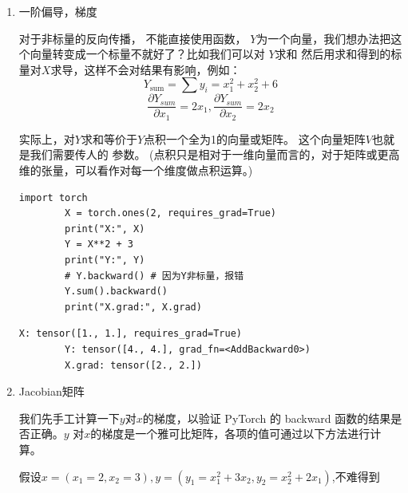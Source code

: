 \label{subsubsec:Pytorch的非标量反向传播}
\begin{enumerate}[label=\arabic*)]
        \item 一阶偏导，梯度

        对于非标量的反向传播，
        不能直接使用函数，
        $Y$为一个向量，我们想办法把这个向量转变成一个标量不就好了？比如我们可以对 $Y$求和
        然后用求和得到的标量对$X$求导，这样不会对结果有影响，例如：
        $$Y_{\mathrm{sum}}=\sum y_{i}=x_{1}^{2}+x_{2}^{2}+6$$
        $$\frac{\partial Y_{sum}}{\partial x_{1}}=2x_{1},\frac{\partial Y_{sum}}{\partial x_{2}}=2x_{2}$$

        实际上，对$Y$求和等价于$Y$点积一个全为1的向量或矩阵。
        这个向量矩阵$V$也就是我们需要传人的  参数。
        (点积只是相对于一维向量而言的，对于矩阵或更高维的张量，可以看作对每一个维度做点积运算。)

        \begin{lstlisting}[style=pythonstyle]
        import torch
        X = torch.ones(2, requires_grad=True)
        print("X:", X)
        Y = X**2 + 3 
        print("Y:", Y)
        # Y.backward() # 因为Y非标量，报错
        Y.sum().backward()
        print("X.grad:", X.grad)
        \end{lstlisting}
        \begin{lstlisting}[style=demostyle,numbers=none]
        X: tensor([1., 1.], requires_grad=True)
        Y: tensor([4., 4.], grad_fn=<AddBackward0>)
        X.grad: tensor([2., 2.])
        \end{lstlisting}    

        \item Jacobian矩阵
        \begin{example}
                \exProblem
                我们先手工计算一下$y$对$x$的梯度，以验证 PyTorch 的 backward 函数的结果是否正确。$y$ 对$x$的梯度是一个雅可比矩阵，各项的值可通过以下方法进行计算。

                \exSolution
                假设$x=\left(x_{1}=2,x_{2}=3\right),y=\left(y_{1}=x_{1}^{2}+3x_{2},y_{2}=x_{2}^{2}+2x_{1}\right)$,不难得到        


\end{example}
\end{enumerate}
